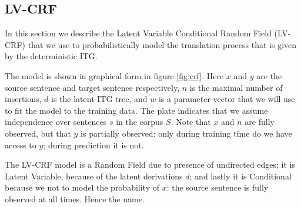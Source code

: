 \documentclass[11pt,a4paper]{article}
\begin{document}
\subsection{LV-CRF}

In this section we describe the Latent Variable Conditional Random Field (LV-CRF) that we use to probabilistically model the translation process that is given by the deterministic ITG.

The model is shown in graphical form in figure \ref{fig:crf}. Here $x$ and $y$ are the source sentence and target sentence respectively, $n$ is the maximal number of insertions, $d$ is the latent ITG tree, and $w$ is a parameter-vector that we will use to fit the model to the training data. The plate indicates that we assume independence over sentences $s$ in the corpus $S$. Note that $x$ and $n$ are fully observed, but that $y$ is partially observed: only during training time do we have access to $y$; during prediction it is not. 

The LV-CRF model is a Random Field due to presence of undirected edges; it is Latent Variable, because of the latent derivations $d$; and lastly it is Conditional because we not to model the probability of $x$: the source sentence is fully observed at all times. Hence the name.
\end{document}
